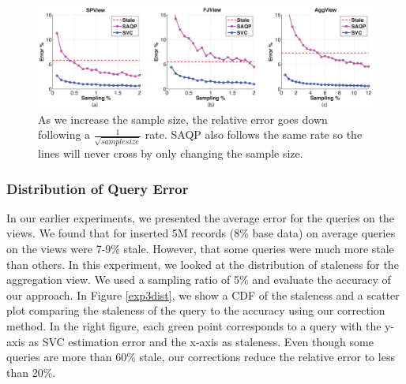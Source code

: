 \begin{figure}[ht!]
 \includegraphics[trim = 45mm 0mm 45mm 0mm, clip,width=\columnwidth]{exp/exp1-samplesize-accuracy.eps}
 \caption{As we increase the sample size, the relative error goes down following a $\frac{1}{\sqrt{samplesize}}$ rate. SAQP also follows the same rate so the lines will never cross by only changing the sample size. \label{exp1sample} }
\end{figure}

\subsubsection{Distribution of Query Error} In our earlier experiments, we presented the average error for the queries on the views.
We found that for inserted 5M records (8\% base data) on average queries on the views were 7-9\% stale. 
However, that some queries were much more stale than others.
In this experiment, we looked at the distribution of staleness for the aggregation view.
We used a sampling ratio of 5\% and evaluate the accuracy of our approach. 
In Figure \ref{exp3dist}, we show a CDF of the staleness and a scatter plot comparing the staleness of the query to the accuracy using our correction method.
In the right figure, each green point corresponds to a query with the y-axis as SVC estimation error and the x-axis as staleness. 
Even though some queries are more than 60\% stale, our corrections reduce the relative error to less than 20\%.

